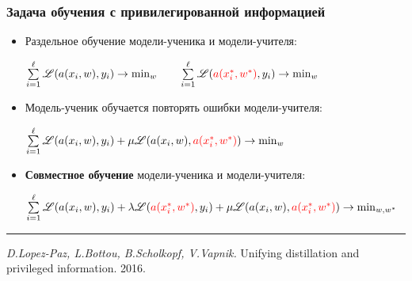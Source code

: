 \documentclass[fullscreen=true, bookmarks=true, hyperref={pdfencoding=unicode}]{beamer}
\begin{document}
\begin{frame}
  \frametitle{Задача обучения с привилегированной информацией}

  \begin{itemize}
    \item Раздельное обучение модели-ученика и {\color{red} модели-учителя}:

    $\sum\limits_{i=1}^\ell \mathscr{L}(a(x_i, w), y_i) \to \min_{w} \quad\quad
    \sum\limits_{i=1}^\ell \mathscr{L}({\color{red}a(x_i^*, w^*)}, y_i) \to \min_{w} $

    \item Модель-ученик обучается повторять ошибки {\color{red} модели-учителя}:

    $\sum\limits_{i=1}^\ell \mathscr{L}(a(x_i, w), y_i) + \mu
     \mathscr{L}(a(x_i, w), {\color{red}a(x_i^*, w^*)}) \to \min_{w} $

    \item {\bf Совместное обучение} модели-ученика и {\color{red} модели-учителя}:

    $\sum\limits_{i=1}^\ell \mathscr{L}(a(x_i, w), y_i) + \lambda \mathscr{L}({\color{red}a(x_i^*, w^*)}, y_i)
    + \mu \mathscr{L}(a(x_i, w), {\color{red}a(x_i^*, w^*)}) \to \min_{w, w^*}$
  \end{itemize}

  \noindent\rule{8cm}{0.4pt}

  {\small
  {\it D.Lopez-Paz, L.Bottou, B.Scholkopf, V.Vapnik.} Unifying distillation and privileged information. 2016.}
\end{frame}
\end{document}
